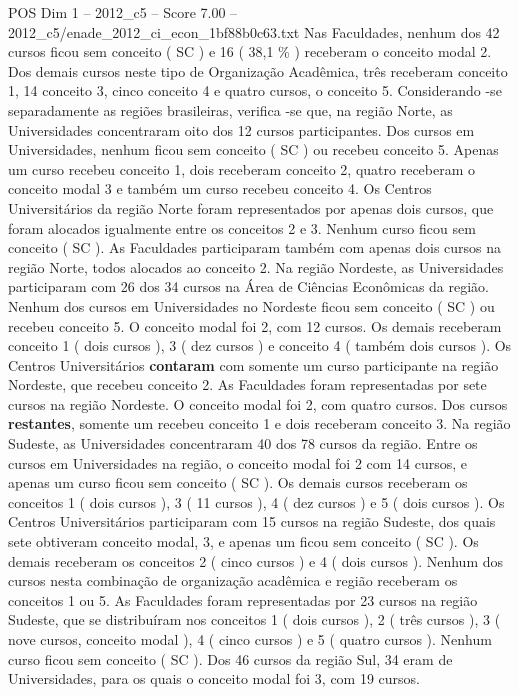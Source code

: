 \begin{textsample}{POS Dim 1 – 2012\_c5 – Score 7.00 – 2012\_c5/enade\_2012\_ci\_econ\_1bf88b0c63.txt}
Nas Faculdades, nenhum dos 42 cursos ficou sem conceito ( SC ) e 16 ( 38,1 \% ) receberam o conceito modal 2.
Dos demais cursos neste tipo de Organização Acadêmica, três receberam conceito 1, 14 conceito 3, cinco conceito 4 e quatro cursos, o conceito 5.
Considerando -se separadamente as regiões brasileiras, verifica -se que, na região Norte, as Universidades concentraram oito dos 12 cursos participantes.
Dos cursos em Universidades, nenhum ficou sem conceito ( SC ) ou recebeu conceito 5.
Apenas um curso recebeu conceito 1, dois receberam conceito 2, quatro receberam o conceito modal 3 e também um curso recebeu conceito 4.
Os Centros Universitários da região Norte foram representados por apenas dois cursos, que foram alocados igualmente entre os conceitos 2 e 3.
Nenhum curso ficou sem conceito ( SC ).
As Faculdades participaram também com apenas dois cursos na região Norte, todos alocados ao conceito 2.
Na região Nordeste, as Universidades participaram com 26 dos 34 cursos na Área de Ciências Econômicas da região.
Nenhum dos cursos em Universidades no Nordeste ficou sem conceito ( SC ) ou recebeu conceito 5.
O conceito modal foi 2, com 12 cursos.
Os demais receberam conceito 1 ( dois cursos ), 3 ( dez cursos ) e conceito 4 ( também dois cursos ).
Os Centros Universitários \textbf{contaram} com somente um curso participante na região Nordeste, que recebeu conceito 2.
As Faculdades foram representadas por sete cursos na região Nordeste.
O conceito modal foi 2, com quatro cursos.
Dos cursos \textbf{restantes}, somente um recebeu conceito 1 e dois receberam conceito 3.
Na região Sudeste, as Universidades concentraram 40 dos 78 cursos da região.
Entre os cursos em Universidades na região, o conceito modal foi 2 com 14 cursos, e apenas um curso ficou sem conceito ( SC ).
Os demais cursos receberam os conceitos 1 ( dois cursos ), 3 ( 11 cursos ), 4 ( dez cursos ) e 5 ( dois cursos ).
Os Centros Universitários participaram com 15 cursos na região Sudeste, dos quais sete obtiveram conceito modal, 3, e apenas um ficou sem conceito ( SC ).
Os demais receberam os conceitos 2 ( cinco cursos ) e 4 ( dois cursos ).
Nenhum dos cursos nesta combinação de organização acadêmica e região receberam os conceitos 1 ou 5.
As Faculdades foram representadas por 23 cursos na região Sudeste, que se distribuíram nos conceitos 1 ( dois cursos ), 2 ( três cursos ), 3 ( nove cursos, conceito modal ), 4 ( cinco cursos ) e 5 ( quatro cursos ).
Nenhum curso ficou sem conceito ( SC ).
Dos 46 cursos da região Sul, 34 eram de Universidades, para os quais o conceito modal foi 3, com 19 cursos.

\end{textsample}
